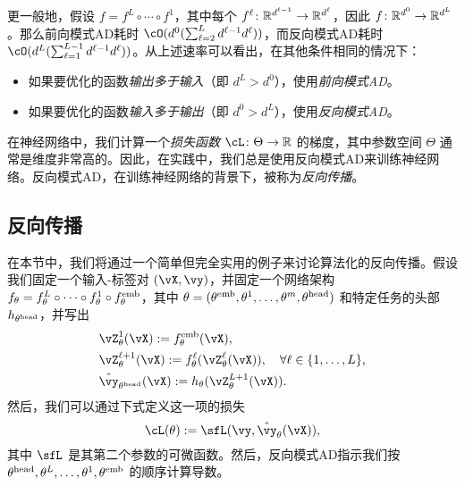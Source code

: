 \documentclass[../../book-main.tex]{subfiles}
\begin{document}
更一般地，假设 \(f = f^{L} \circ \cdots \circ f^{1}\)，其中每个 \(f^{\ell} \colon \mathbb{R}^{d^{\ell - 1}} \to \mathbb{R}^{d^{\ell}}\)，因此 \(f \colon \mathbb{R}^{d^{0}} \to \mathbb{R}^{d^{L}}\)。那么前向模式AD耗时 \(\cO(d^{0}(\sum_{\ell = 2}^{L}d^{\ell - 1}d^{\ell}))\)，而反向模式AD耗时 \(\cO(d^{L}(\sum_{\ell = 1}^{L - 1}d^{\ell - 1}d^{\ell}))\)。从上述速率可以看出，在其他条件相同的情况下：
\begin{itemize}
    \item 如果要优化的函数\textit{输出多于输入}（即 \(d^{L} > d^{0}\)），使用\textit{前向模式AD}。
    \item 如果要优化的函数\textit{输入多于输出}（即 \(d^{0} > d^{L}\)），使用\textit{反向模式AD}。
\end{itemize}
在神经网络中，我们计算一个\textit{损失函数} \(\cL \colon \Theta \to \R\) 的梯度，其中参数空间 \(\Theta\) 通常是维度非常高的。因此，在实践中，我们总是使用反向模式AD来训练神经网络。反向模式AD，在训练神经网络的背景下，被称为\textit{反向传播}。

\subsection{反向传播}
\label{app:BP-section}
在本节中，我们将通过一个简单但完全实用的例子来讨论算法化的反向传播。假设我们固定一个输入-标签对 \((\vX, \vy)\)，并固定一个网络架构 \(f_{\theta} = f_{\theta}^{L} \circ \cdots \circ f_{\theta}^{1} \circ f_{\theta}^{\mathrm{emb}}\)，其中 \(\theta = (\theta^{\mathrm{emb}}, \theta^{1}, \dots, \theta^{m}, \theta^{\mathrm{head}})\) 和特定任务的头部 \(h_{\theta^{\mathrm{head}}}\)，并写出
\begin{align}
    &\vZ_{\theta}^{1}(\vX) := f_{\theta}^{\emb}(\vX), \\ 
    &\vZ_{\theta}^{\ell + 1}(\vX) := f_{\theta}^{\ell}(\vZ_{\theta}^{\ell}(\vX)), \quad \forall \ell \in \{1, \dots, L\}, \\
    &\hat{\vy}_{\theta^{\head}}(\vX) := h_{\theta}(\vZ_{\theta}^{L+1}(\vX)).
\end{align}
然后，我们可以通过下式定义这一项的损失
\begin{equation}
    \cL(\theta) := \sfL(\vy, \hat{\vy}_{\theta}(\vX)),
\end{equation}
其中 \(\sfL\) 是其第二个参数的可微函数。然后，反向模式AD指示我们按 \(\theta^{\mathrm{head}}, \theta^{L}, \dots, \theta^{1}, \theta^{\mathrm{emb}}\) 的顺序计算导数。
\end{document}
